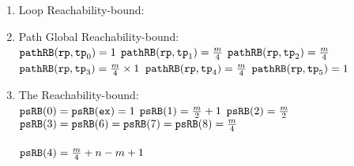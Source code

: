 \begin{enumerate}
    \item Loop Reachability-bound:
    \\
    \item Path Global Reachability-bound:
    \\
    $\mathtt{pathRB}(\mathtt{rp}, \mathtt{tp}_0) = 1$ \quad
    $\mathtt{pathRB}(\mathtt{rp}, \mathtt{tp}_1) = \frac{m}{4}$ \quad
    $\mathtt{pathRB}(\mathtt{rp}, \mathtt{tp}_2) = \frac{m}{4}$ \\
    $\mathtt{pathRB}(\mathtt{rp}, \mathtt{tp}_3) = \frac{m}{4} \times 1$ \quad
    $\mathtt{pathRB}(\mathtt{rp}, \mathtt{tp}_4) = \frac{m}{4}$ \quad
    $\mathtt{pathRB}(\mathtt{rp}, \mathtt{tp}_5) = 1$
    \item The Reachability-bound:
    \\
    $\mathtt{psRB}(0) = \mathtt{psRB}(\mathtt{ex}) = 1$ \quad
    $\mathtt{psRB}(1) = \frac{m}{2} + 1$ \quad
    $\mathtt{psRB}(2) = \frac{m}{2} $ \\
    $\mathtt{psRB}(3) = \mathtt{psRB}(6) = \mathtt{psRB}(7)  = \mathtt{psRB}(8) = \frac{m}{4} $ \\
     \\
    $\mathtt{psRB}(4) =  \frac{m}{4} + n - m + 1$
  \end{enumerate}